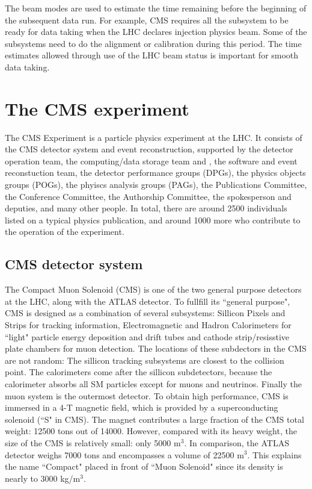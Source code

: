 The beam modes are used to estimate the time remaining before the beginning of the subsequent data run. For example, CMS requires all the subsystem to be ready for data taking when the LHC declares injection physics beam. Some of the subsystems need to do the alignment or calibration during this period. The time estimates allowed through use of the LHC beam status is important for smooth data taking.

\clearpage
\section{The CMS experiment}

The CMS Experiment is a particle physics experiment at the LHC. It consists of the CMS detector system and event reconstruction, supported by the detector operation team, the computing/data storage team and , the software and event reconstuction team, the detector performance groups (DPGs), the physics objects groups (POGs), the phyiscs analysis groups (PAGs), the Publications Committee, the Conference Committee, the Authorship Committee, the spokesperson and deputies, and many other people.  In total, there are around 2500 individuals listed on a typical physics publication, and around 1000 more who contribute to the operation of the experiment.

\clearpage
\subsection{CMS detector system}

The Compact Muon Solenoid (CMS) is one of the two general purpose detectors at the LHC, along with the ATLAS detector. To fullfill its ``general purpose", CMS is designed as a combination of several subsystems: Sillicon Pixels and Strips for tracking information, Electromagnetic and Hadron Calorimeters for ``light" particle energy deposition and drift tubes and cathode strip/resisstive plate chambers for muon detection. The locations of these subdectors in the CMS are not random: The sillicon tracking subsystems are closest to the collision point. The calorimeters come after the sillicon subdetectors, because the calorimeter absorbs all SM particles except for muons and neutrinos. Finally the muon system is the outermost detector. To obtain high performance, CMS is immersed in a 4-T magnetic field, which is provided by a superconducting solenoid (``S" in CMS). The magnet contributes a large fraction of the CMS total weight: 12500 tons out of 14000. However, compared with its heavy weight, the size of the CMS is relatively small: only 5000 m$^{3}$. In comparison, the ATLAS detector weighs 7000 tons and encompasses a volume of 22500 m$^{3}$. This explains the name ``Compact" placed in front of ``Muon Solenoid" since its density is nearly to 3000 kg/m$^{3}$.

